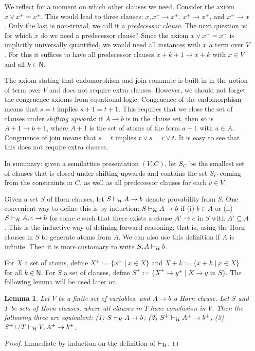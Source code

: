 \documentclass[11pt,a4paper]{article}
\newtheorem{lemma}[theorem]{Lemma}
\newcommand{\N}{\mathsf{N}}
\newcommand\set[1]{\{#1\}}
\newcommand\prvH{\vdash_{\cal H}}
\newcommand\upS[1]{\overline{S_{#1}}}
\begin{document}
We reflect for a moment on which other clauses we need.
Consider the axiom $x \vee x^+ = x^+$. This would lead to three
clauses: $x,x^+ \to x^+$, $x^+ \to x^+$, and $x^+ \to x$.
Only the last is non-trivial, we call it a \emph{predecessor clause}.
The next question is: for which $x$ do we need a predecessor clause?
Since the axiom $x \vee x^+ = x^+$ is implicitly universally quantified,
we would need all instances with $x$ a term over $V$.
For this it suffices to have all predecessor clauses
$x+k+1 \to x+k$ with $x\in V$ and all $k\in \N$.

The axiom stating that endomorphism and join commute is built-in
in the notion of term over $V$ and does not require extra clauses.
However, we should not forget the congruence axioms from
equational logic. Congruence of the endomorphism means that $s=t$
implies $s+1=t+1$. This requires that we close the set of clauses
under \emph{shifting upwards}: if $A\to b$ is in the clause set,
then so is $A+1\to b+1$, where $A+1$ is the set of atoms of
the form $a+1$ with $a\in A$. 
Congruence of join means that $s=t$ implies $r\vee s=r\vee t$.
It is easy to see that this does not require extra clauses. 

In summary: given a semilattice presentation $(V,C)$,
let $\upS{C}$ be the smallest set of clauses that 
is closed under shifting upwards and contains
the set $S_C$ coming from the constraints in $C$,
as well as all predecessor clauses for each $v\in V$. 

Given a set $S$ of Horn clauses,
let $S\prvH A\to b$ denote provability from $S$.
One convenient way to define this is by induction:
$S\prvH A\to b$ if 
(i) $b\in A$ or 
(ii) $S\prvH A,c\to b$ for some $c$ such that there exists
a clause $A'\to c$ in $S$ with $A'\subseteq A$.
This is the inductive way of defining forward reasoning,
that is, using the Horn clauses in $S$ to generate atoms from $A$.
We can also use this definition if $A$ is infinite.
Then it is more customary to write $S,A \prvH b$.

For $X$ a set of atoms, define $X^+ := \set{x^+ \mid x\in X}$
and $X+k := \set{x+k \mid x\in X}$ for all $k\in\N$.
For $S$ a set of clauses, define 
$S^+ := \set{X^+\to y^+ \mid \text{$X\to y$ in $S$}}$.
The following lemma will be used later on.

\begin{lemma}\label{lem:shift-up}
Let $V$ be a finite set of variables, and $A\to b$ a Horn clause.
Let $S$ and $T$ be sets of Horn clauses, where all clauses in $T$ 
have conclusion \emph{in} $V$. Then the following three are equivalent:
(1) $S\prvH A\to b$; (2) $S^+\prvH A^+\to b^+$; (3) $S^+ \cup T \prvH V,A^+\to b^+$.
\end{lemma} 
\begin{proof} 
Immediate by induction on the definition of $\prvH$.
\end{proof}
\end{document}
